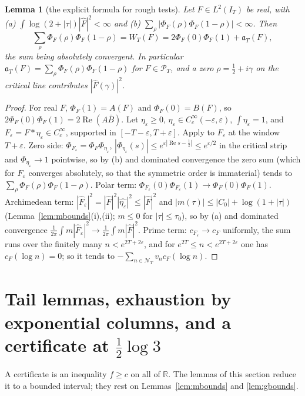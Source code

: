 \documentclass[11pt]{amsart}
\newtheorem{lemma}[theorem]{Lemma}
\theoremstyle{definition}
\theoremstyle{remark}
\newcommand{\R}{\mathbb R}
\newcommand{\Rel}{\operatorname{Re}}
\newcommand{\PT}{\mathcal P_T}
\newcommand{\IT}{I_T}
\newcommand{\Fh}{\widehat F}
\newcommand{\cF}{c_F}
\newcommand{\NT}{\mathcal N_T}
\begin{document}
\begin{lemma}[the explicit formula for rough tests]\label{lem:roughEF}
Let $F\in L^2(\IT)$ be real, with \emph{(a)} $\int\log(2+|\tau|)|\Fh|^2<\infty$ and \emph{(b)}
$\sum_\rho|\Phi_F(\rho)\Phi_F(1-\rho)|<\infty$. Then
\[
\sum_\rho\Phi_F(\rho)\Phi_F(1-\rho)=W_T(F)=2\Phi_F(0)\Phi_F(1)+\mathfrak a_T(F),
\]
the sum being absolutely convergent. In particular $\mathfrak a_T(F)=\sum_\rho\Phi_F(\rho)\Phi_F(1-\rho)$
for $F\in\PT$, and a zero $\rho=\frac12+i\gamma$ on the critical line contributes $|\Fh(\gamma)|^2$.
\end{lemma}
\begin{proof}
For real $F$, $\Phi_F(1)=A(F)$ and $\Phi_F(0)=B(F)$, so $2\Phi_F(0)\Phi_F(1)=2\Rel(A\bar B)$. Let
$\eta_\varepsilon\ge0$, $\eta_\varepsilon\in C_c^\infty(-\varepsilon,\varepsilon)$, $\int\eta_\varepsilon=1$,
and $F_\varepsilon=F*\eta_\varepsilon\in C_c^\infty$, supported in $[-T-\varepsilon,T+\varepsilon]$.
Apply \cite[Thm.~8.4]{Paper45} to $F_\varepsilon$ at the window $T+\varepsilon$. Zero side:
$\Phi_{F_\varepsilon}=\Phi_F\Phi_{\eta_\varepsilon}$, $|\Phi_{\eta_\varepsilon}(s)|\le e^{\varepsilon|\Rel s-\frac12|}\le e^{\varepsilon/2}$
in the critical strip and $\Phi_{\eta_\varepsilon}\to1$ pointwise, so by (b) and dominated convergence
the zero sum (which for $F_\varepsilon$ converges absolutely, so that the symmetric order is
immaterial) tends to $\sum_\rho\Phi_F(\rho)\Phi_F(1-\rho)$. Polar term:
$\Phi_{F_\varepsilon}(0)\Phi_{F_\varepsilon}(1)\to\Phi_F(0)\Phi_F(1)$. Archimedean term:
$|\Fh_\varepsilon|^2=|\Fh|^2|\widehat{\eta_\varepsilon}|^2\le|\Fh|^2$ and $|m(\tau)|\le|C_0|+\log(1+|\tau|)$
(Lemma~\ref{lem:mbounds}(i),(ii); $m\le0$ for $|\tau|\le\tau_0$), so by (a) and dominated convergence
$\frac1{2\pi}\int m|\Fh_\varepsilon|^2\to\frac1{2\pi}\int m|\Fh|^2$. Prime term: $c_{F_\varepsilon}\to\cF$
uniformly, the sum runs over the finitely many $n<e^{2T+2\varepsilon}$, and for
$e^{2T}\le n<e^{2T+2\varepsilon}$ one has $\cF(\log n)=0$; so it tends to $-\sum_{n\in\NT}v_n\cF(\log n)$.
\end{proof}


\section{Tail lemmas, exhaustion by exponential columns, and a certificate at \texorpdfstring{$\tfrac12\log3$}{(1/2) log 3}}\label{sec:tails}

A certificate is an inequality $f\ge c$ on all of $\R$. The lemmas of this section reduce it to a
bounded interval; they rest on Lemmas~\ref{lem:mbounds} and \ref{lem:gbounds}.
\end{document}
